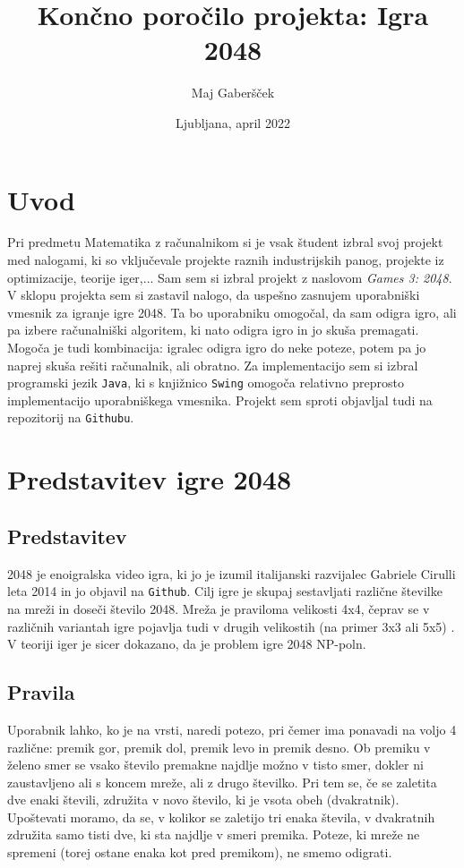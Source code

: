 \documentclass{article}
\title{Končno poročilo projekta: Igra 2048}
\author{Maj Gaberšček}
\date{Ljubljana, april 2022}
\begin{document}
\maketitle

\section{Uvod}
Pri predmetu Matematika z računalnikom si je vsak študent izbral svoj projekt med nalogami, ki so vključevale projekte raznih industrijskih panog, projekte iz optimizacije, teorije iger,... Sam sem si izbral projekt z naslovom \emph{Games 3: 2048}. V sklopu projekta sem si zastavil nalogo, da uspešno zasnujem uporabniški vmesnik za igranje igre 2048. Ta bo uporabniku omogočal, da sam odigra igro, ali pa izbere računalniški algoritem, ki nato odigra igro in jo skuša premagati. Mogoča je tudi kombinacija: igralec odigra igro do neke poteze, potem pa jo naprej skuša rešiti računalnik, ali obratno. Za implementacijo sem si izbral programski jezik \texttt{Java}, ki s knjižnico \texttt{Swing} omogoča relativno preprosto implementacijo uporabniškega vmesnika. Projekt sem sproti objavljal tudi na repozitorij na \texttt{Githubu}.

\section{Predstavitev igre 2048}

\subsection{Predstavitev}

2048 je enoigralska video igra, ki jo je izumil italijanski razvijalec Gabriele Cirulli leta 2014 in jo objavil na \texttt{Github}. Cilj igre je skupaj sestavljati različne številke na mreži in doseči število 2048. Mreža je praviloma velikosti 4x4, čeprav se v različnih variantah igre pojavlja tudi v drugih velikostih (na primer 3x3 ali 5x5) \cite{wiki:2048_(video_game)}. V teoriji iger je sicer dokazano, da je problem igre 2048 NP-poln.\cite{DBLP:journals/corr/AbdelkaderAD15}

\subsection{Pravila}

Uporabnik lahko, ko je na vrsti, naredi potezo, pri čemer ima ponavadi na voljo 4 različne: premik gor, premik dol, premik levo in premik desno. Ob premiku v želeno smer se vsako število premakne najdlje možno v tisto smer, dokler ni zaustavljeno ali s koncem mreže, ali z drugo številko. Pri tem se, če se zaletita dve enaki števili, združita v novo število, ki je vsota obeh (dvakratnik). Upoštevati moramo, da se, v kolikor se zaletijo tri enaka števila, v dvakratnih združita samo tisti dve, ki sta najdlje v smeri premika. Poteze, ki mreže ne spremeni (torej ostane enaka kot pred premikom), ne smemo odigrati.
\end{document}
